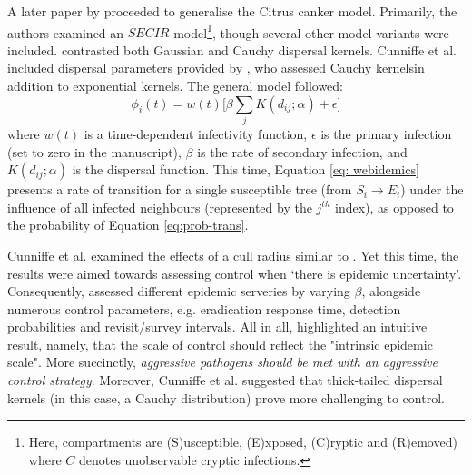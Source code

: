 A later paper by \cite{WEBIDEMICS} proceeded to generalise the Citrus canker model.
Primarily, the authors examined an $SECIR$ model\footnote{
Here, compartments are (S)usceptible, (E)xposed, (C)ryptic and (R)emoved) where $C$ 
denotes unobservable cryptic infections.}, though several other model variants were included. 
\cite{WEBIDEMICS} contrasted both Gaussian and Cauchy dispersal kernels.
Cunniffe et al. included dispersal parameters provided by \cite{neri2014bayesian}, who
assessed Cauchy kernels\textemdash in addition to exponential kernels.
The general model followed:
\begin{equation}
\label{eq: webidemics}
     \phi_i(t) = w(t)\big[\beta \sum_j K(d_{ij}; \alpha) + \epsilon \big]
\end{equation}
where $w(t)$ is a time-dependent infectivity function, $\epsilon$ is the primary infection 
(set to zero in the manuscript), $\beta$ is the rate of secondary infection, and $K(d_{ij}; \alpha)$
is the dispersal function. This time, Equation \ref{eq: webidemics} presents a rate of transition for a single
susceptible tree (from $S_i \rightarrow E_i$) under the influence of all infected neighbours (represented by the $j^{th}$ index),
as opposed to the probability of Equation \ref{eq:prob-trans}.

Cunniffe et al. examined the effects of a cull radius similar to \cite{parnell2010effect}. 
Yet this time, the results were aimed towards assessing control when `there is epidemic uncertainty'.
Consequently, \cite{WEBIDEMICS} assessed different epidemic serveries by varying $\beta$, alongside
numerous control parameters, e.g. eradication response time, detection probabilities and revisit/survey intervals. 
All in all, \cite{WEBIDEMICS} highlighted an intuitive result, namely, that the scale of control should
reflect the "intrinsic epidemic scale". More succinctly, \textit{aggressive pathogens should be met with 
an aggressive control strategy}. Moreover, Cunniffe et al. suggested that thick-tailed dispersal kernels
(in this case, a Cauchy distribution) prove more challenging to control.

